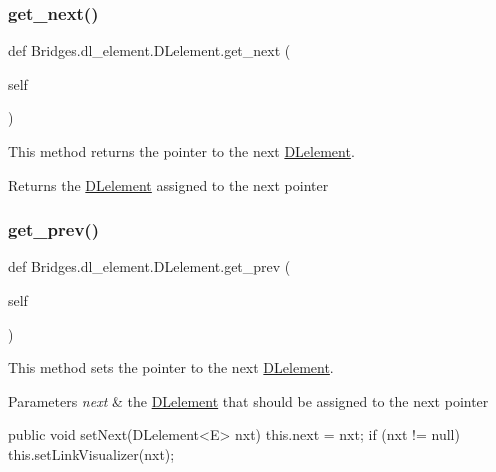 \subsubsection{\texorpdfstring{get\+\_\+next()}{get\_next()}}
{\footnotesize\ttfamily def Bridges.\+dl\+\_\+element.\+D\+Lelement.\+get\+\_\+next (\begin{DoxyParamCaption}\item[{}]{self }\end{DoxyParamCaption})}



This method returns the pointer to the next \mbox{\hyperlink{class_bridges_1_1dl__element_1_1_d_lelement}{D\+Lelement}}. 

\begin{DoxyReturn}{Returns}
the \mbox{\hyperlink{class_bridges_1_1dl__element_1_1_d_lelement}{D\+Lelement}} assigned to the next pointer 
\end{DoxyReturn}
\mbox{\label{class_bridges_1_1dl__element_1_1_d_lelement_ab3a51eae57870b6b45b09b8810d9b22b}} 
\subsubsection{\texorpdfstring{get\+\_\+prev()}{get\_prev()}}
{\footnotesize\ttfamily def Bridges.\+dl\+\_\+element.\+D\+Lelement.\+get\+\_\+prev (\begin{DoxyParamCaption}\item[{}]{self }\end{DoxyParamCaption})}



This method sets the pointer to the next \mbox{\hyperlink{class_bridges_1_1dl__element_1_1_d_lelement}{D\+Lelement}}. 


\begin{DoxyParams}{Parameters}
{\em next} & the \mbox{\hyperlink{class_bridges_1_1dl__element_1_1_d_lelement}{D\+Lelement}} that should be assigned to the next pointer\\
\hline
\end{DoxyParams}
\begin{DoxyVerb}    public void setNext(DLelement<E> nxt) {
        this.next = nxt;
        if (nxt != null)
            this.setLinkVisualizer(nxt);
    }
\end{DoxyVerb}


